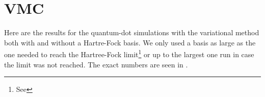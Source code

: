 \section{VMC}
    Here are the results for the quantum-dot simulations with the variational
    method both with and without a Hartre-Fock basis. We only used a basis as
    large as the one needed to reach the Hartree-Fock limit\footnote{See
    } or up to the largest one run in case the limit was not
    reached. The exact numbers are seen in .

